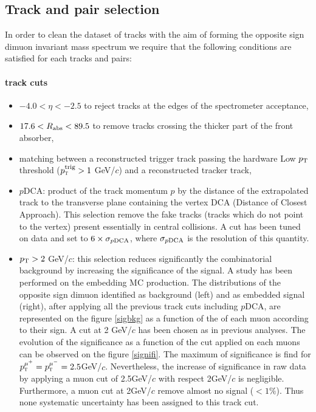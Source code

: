 \subsection{\label{TrackCut}Track and pair selection}

In order to clean the dataset of tracks with the aim of forming the opposite sign dimuon invariant mass spectrum we require that the following conditions are satisfied for each tracks and pairs:

\paragraph{track cuts}
\begin{itemize}
\item $-4.0<\eta<-2.5$  to reject tracks at the edges of the spectrometer acceptance,
\item $17.6<R_{\rm abs}<89.5$ to remove tracks crossing the thicker part of the front absorber,
\item matching between a reconstructed trigger track passing the hardware Low $p_{\rm T}$ threshold ($p_{\mathrm{\textsc{t}}}^{\mathrm{trig}}>1$ GeV/$c$) and a reconstructed tracker track,
\item $p$DCA: product of the track momentum $p$ by the distance of the extrapolated track to the transverse plane containing the vertex DCA (Distance of Closest Approach). 
This selection remove the fake tracks (tracks which do not point to the vertex) present essentially in central collisions.
A cut has been tuned on data and set to $6\times\sigma_{p\rm DCA}$, where $\sigma_{p\rm DCA}$ is the resolution of this quantity.
\item $p_{\rm T}>2$ GeV/$c$: this selection reduces significantly the combinatorial background by increasing the significance of the signal.
A study has been performed on the embedding MC production.
The distributions of the opposite sign dimuon identified as background (left) and as \ups embedded signal (right), after applying all the previous track cuts including $p$DCA, are represented on the figure \ref{sigbkg} as a function of the \pt of each muon according to their sign.
A cut at 2 GeV/$c$ has been chosen as in previous \upsi analyses.
The evolution of the significance as a function of the \pt cut applied on each muons can be observed on the figure \ref{signifi}.
The maximum of significance is find for $p_{\mathrm{\textsc{t}}}^{\mu^{+}}=p_{\mathrm{\textsc{t}}}^{\mu^{-}}=2.5$\;GeV/$c$.
Nevertheless, the increase of significance in raw data by applying a muon \pt cut of 2.5\;GeV/$c$ with respect 2\;GeV/$c$ is negligible.
Furthermore, a muon \pt cut at 2\;GeV/$c$ remove almost  no \ups signal ($<1\%$).
Thus none systematic uncertainty has been assigned to this track cut.
\end{itemize}

